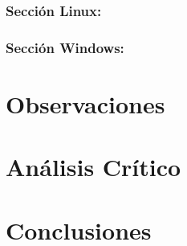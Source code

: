 \documentclass[12pt]{article}
\begin{document}
  		\subsubsection{Sección Linux:}
            			 
        
	    \subsubsection{Sección Windows:}


  
  \section{Observaciones}


	
	\section{Análisis Crítico}

	
	\section{Conclusiones}
\end{document}
